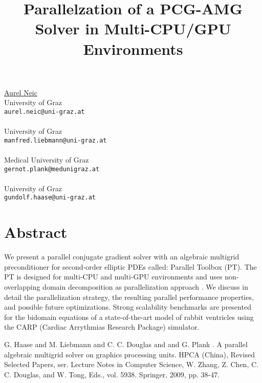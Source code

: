 \title{Parallelzation of a PCG-AMG Solver in Multi-CPU/GPU Environments}
 \author{} \institute{}
\maketitle
\begin{center}
{\large \underline{Aurel Neic}}\\
University of Graz\\
{\tt aurel.neic@uni-graz.at}
\\ \vspace{4mm}{\large Manfred Liebmann}\\
University of Graz\\
{\tt manfred.liebmann@uni-graz.at}
\\ \vspace{4mm}{\large Gernot Plank}\\
Medical University of Graz\\
{\tt gernot.plank@medunigraz.at }
\\ \vspace{4mm}{\large Gundolf Haase}\\
University of Graz\\
{\tt gundolf.haase@uni-graz.at}

\end{center}

\section*{Abstract}

We present a parallel conjugate gradient solver with an algebraic multigrid preconditioner for second-order elliptic PDEs called: Parallel Toolbox (PT). The PT is designed for multi-CPU and multi-GPU environments and uses non-overlapping domain decomposition as parallelization approach \cite{ptamg}. 
We discuss in detail the parallelization strategy, the resulting parallel performance properties, and possible future optimizations.
Strong scalability benchmarks are presented for the bidomain equations of a state-of-the-art model of rabbit ventricles using the CARP (Cardiac Arrythmias Research Package) simulator.


\begin{thebibliography}{10}

{\sc G. Haase and M. Liebmann and C. C. Douglas and and G. Plank }. {A parallel algebraic multigrid solver on graphics processing units}. HPCA (China), Revised Selected Papers, ser. Lecture Notes in Computer Science, W. Zhang, Z. Chen, C. C. Douglas, and W. Tong, Eds., vol. 5938. Springer, 2009, pp. 38-47.

\end{thebibliography}
